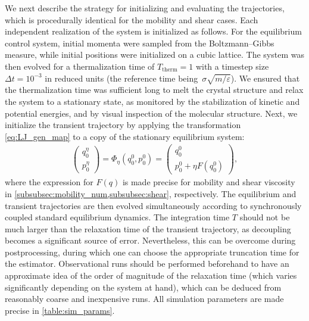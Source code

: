 \documentclass[11pt]{article}
\theoremstyle{definition}
\begin{document}
We next describe the strategy for initializing and evaluating the trajectories, which is procedurally identical for the mobility and shear cases. Each independent realization of the system is initialized as follows. For the equilibrium control system, initial momenta were sampled from the Boltzmann--Gibbs measure, while initial positions were initialized on a cubic lattice. The system was then evolved for a thermalization time of $T_\mathrm{therm} = 1$ with a timestep size $\Delta t=10^{-3}$ in reduced units (the reference time being~$\sigma\sqrt{m/\varepsilon}$). We ensured that the thermalization time was sufficient long to melt the crystal structure and relax the system to a stationary state, as monitored by the stabilization of kinetic and potential energies, and by visual inspection of the molecular structure. Next, we initialize the transient trajectory by applying the transformation \eqref{eq:LJ_gen_map} to a copy of the stationary equilibrium system:
\begin{align}
    \begin{pmatrix}
        q_0^\eta \\ p_0^\eta
    \end{pmatrix}
	 = \Phi_\eta(q_0^0,p_0^0) = 
	\begin{pmatrix}
 	  q_0^0 \\ p_0^0 + \eta F(q_0^0)
 	\end{pmatrix},
 	\label{eq:LJ_gen_map}
\end{align}
where the expression for $F(q)$ is made precise for mobility and shear viscosity in \cref{subsubsec:mobility_num,subsubsec:shear}, respectively. The equilibrium and transient trajectories are then evolved simultaneously according to synchronously coupled standard equilibrium dynamics. The integration time $T$ should not be much larger than the relaxation time of the transient trajectory, as decoupling becomes a significant source of error. Nevertheless, this can be overcome during postprocessing, during which one can choose the appropriate truncation time for the estimator. 
Observational runs should be performed beforehand to have an approximate idea of the order of magnitude of the relaxation time (which varies significantly depending on the system at hand), which can be deduced from reasonably coarse and inexpensive runs. All simulation parameters are made precise in \cref{table:sim_params}.
\end{document}
